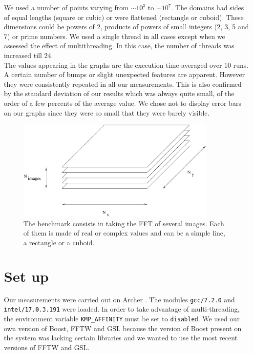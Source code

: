 \documentclass[12pt, a4paper]{article}
\begin{document}
We used a number of points varying from $\sim 10^3$ to $\sim 10^7$. The domains had sides of equal lengths (square or cubic) or were flattened (rectangle or cuboid). These dimensions could be powers of 2, products of powers of small integers (2, 3, 5 and 7) or prime numbers. We used a single thread in all cases except when we assessed the effect of multithreading. In this case, the number of threads was increased till 24.\\

The values appearing in the graphs are the execution time averaged over 10 runs. A certain number of bumps or slight unexpected features are apparent. However they were consistently repeated in all our measurements. This is also confirmed by the standard deviation of our results which was always quite small, of the order of a few percents of the average value. We chose not to display error bars on our graphs since they were so small that they were barely visible. 

\begin{figure}[H]
\captionsetup{width=0.6\textwidth}
\centering
\includegraphics[height=5cm]{benchmark.pdf}
\caption{The benchmark consists in taking the FFT of several images. Each of them is made of real or complex values and can be a simple line, a rectangle or a cuboid.}
\label{benchmark}
\end{figure}

\section{Set up}
Our measurements were carried out on Archer \cite{archer}. The modules \texttt{gcc/7.2.0} and \\ \texttt{intel/17.0.3.191} were loaded. In order to take advantage of multi-threading, the environment variable \texttt{KMP\_AFFINITY} must be set to \texttt{disabled}. We used our own version of Boost, FFTW and GSL because the version of Boost present on the system was lacking certain libraries and we wanted to use the most recent versions of FFTW and GSL.\\
\end{document}

